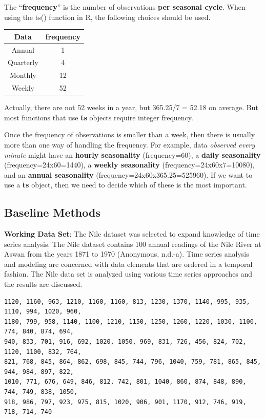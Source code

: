 \documentclass[
]{book}
\begin{document}
The ``\textbf{frequency}'' is the number of observations \textbf{\color{red}per seasonal cycle}. When using the ts() function in R, the following choices should be used.

\begin{longtable}[]{@{}cc@{}}
\toprule\noalign{}
Data & frequency \\
\midrule\noalign{}
\endhead
\bottomrule\noalign{}
\endlastfoot
Annual & 1 \\
Quarterly & 4 \\
Monthly & 12 \\
Weekly & 52 \\
\end{longtable}

Actually, there are not 52 weeks in a year, but 365.25/7 = 52.18 on average. But most functions that use \textbf{ts} objects require integer frequency.

Once the frequency of observations is smaller than a week, then there is usually more than one way of handling the frequency. For example, data \emph{\color{red}observed every minute} might have an \textbf{hourly seasonality} (frequency=60), a \textbf{daily seasonality} (frequency=24x60=1440), a \textbf{weekly seasonality} (frequency=24x60x7=10080), and an \textbf{annual seasonality} (frequency=24x60x365.25=525960). If we want to use a \textbf{ts} object, then we need to decide which of these is the most important.

\hypertarget{baseline-methods}{%
\subsection{Baseline Methods}\label{baseline-methods}}

\textbf{Working Data Set}: The Nile dataset was selected to expand knowledge of time series analysis. The Nile dataset contains 100 annual readings of the Nile River at Aswan from the years 1871 to 1970 (Anonymous, n.d.-a). Time series analysis and modeling are concerned with data elements that are ordered in a temporal fashion. The Nile data set is analyzed using various time series approaches and the results are discussed.

\begin{verbatim}
1120, 1160, 963, 1210, 1160, 1160, 813, 1230, 1370, 1140, 995, 935, 1110, 994, 1020, 960,
1180, 799, 958, 1140, 1100, 1210, 1150, 1250, 1260, 1220, 1030, 1100, 774, 840, 874, 694,
940, 833, 701, 916, 692, 1020, 1050, 969, 831, 726, 456, 824, 702, 1120, 1100, 832, 764, 
821, 768, 845, 864, 862, 698, 845, 744, 796, 1040, 759, 781, 865, 845, 944, 984, 897, 822,
1010, 771, 676, 649, 846, 812, 742, 801, 1040, 860, 874, 848, 890, 744, 749, 838, 1050, 
918, 986, 797, 923, 975, 815, 1020, 906, 901, 1170, 912, 746, 919, 718, 714, 740
\end{verbatim}
\end{document}
